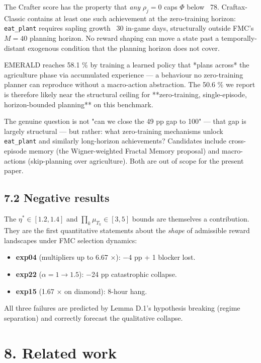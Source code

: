 The Crafter score has the property that \emph{any} $\rho_j = 0$ caps $\Phi$
below ~78. Craftax-Classic contains at least one such achievement at
the zero-training horizon: \texttt{eat\_plant} requires sapling growth ~30
in-game days, structurally outside FMC's $M = 40$ planning horizon.
No reward shaping can move a state past a temporally-distant exogenous
condition that the planning horizon does not cover.

EMERALD reaches 58.1 \% by training a learned policy that *plans
across* the agriculture phase via accumulated experience — a behaviour
no zero-training planner can reproduce without a macro-action
abstraction. The 50.6 \% we report is therefore likely near the
structural ceiling for **zero-training, single-episode, horizon-bounded
planning** on this benchmark.

The genuine question is not "can we close the 49 pp gap to 100" — that
gap is largely structural — but rather: what zero-training mechanisms
unlock \texttt{eat\_plant} and similarly long-horizon achievements? Candidates
include cross-episode memory (the Wigner-weighted Fractal Memory
proposal) and macro-actions (skip-planning over agriculture). Both are
out of scope for the present paper.

\subsection{7.2 Negative results}

The $\eta^* \in [1.2, 1.4]$ and $\prod_k \mu_{T_k} \in [3, 5]$ bounds
are themselves a contribution. They are the first quantitative
statements about the \emph{shape} of admissible reward landscapes under
FMC selection dynamics:

\begin{itemize}
\item \textbf{exp04} (multipliers up to 6.67 ×): −4 pp + 1 blocker lost.
\item \textbf{exp22} ($\alpha = 1 \to 1.5$): −24 pp catastrophic collapse.
\item \textbf{exp15} (1.67 × on diamond): 8-hour hang.
\end{itemize}
All three failures are predicted by Lemma D.1's hypothesis breaking
(regime separation) and correctly forecast the qualitative collapse.

\hrulefill

\section{8. Related work}

